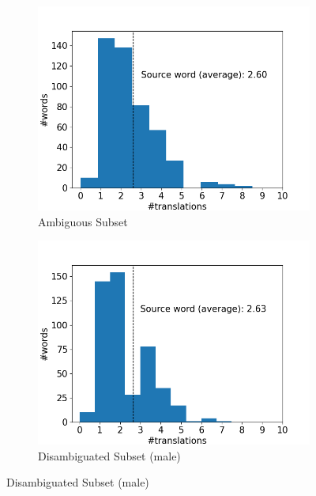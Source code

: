 \begin{figure}[!htb]
     \centering
     
     \begin{subfigure}{0.49\textwidth}
         \centering
         \includegraphics[width=\textwidth]{figures/alignment/align_10/word_translations_original.png}
         \caption{Ambiguous Subset}
         \label{fig:alignment_translation_ambiguous}
     \end{subfigure}
     \hfill
     \begin{subfigure}{0.49\textwidth}
         \centering
         \includegraphics[width=\textwidth]{figures/alignment/align_10/word_translations_male.png}
         \caption{Disambiguated Subset (male)}

\end{subfigure}
\end{figure}
